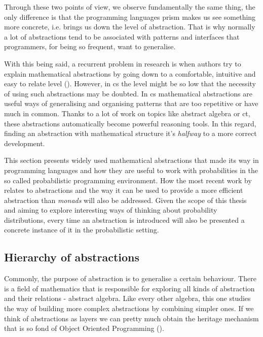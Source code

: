 \documentclass[
  oneside,
  11pt, a4paper,
  footinclude=true,
  headinclude=true,
  cleardoublepage=empty
]{scrbook}
\theoremstyle{definition}
\theoremstyle{definition}
\begin{document}
	    Through these two points of view, we observe fundamentally the same thing, the only difference is that the programming languages prism makes us see something more concrete, i.e. brings us down the level of abstraction. That is why normally a lot of abstractions tend to be associated with patterns and interfaces that programmers, for being so frequent, want to generalise.
	    
	    With this being said, a recurrent problem in research is when authors try to explain mathematical abstractions by going down to a comfortable, intuitive and easy to relate level (\cite{DBLP:journals/corr/abs-1803-10195}). However, in \gls{cs} the level might be so low that the necessity of using such abstractions may be doubted. In \gls{cs} mathematical abstractions are useful ways of generalising and organising patterns that are too repetitive or have much in common. Thanks to a lot of work on topics like abstract algebra or \gls{ct}, these abstractions automatically become powerful reasoning tools. In this regard, finding an abstraction with mathematical structure it's \emph{halfway} to a more correct development.
	    
	    This section presents widely used mathematical abstractions that made its way in programming languages and how they are useful to work with probabilities in the so called probabilistic programming environment. How the most recent work by \cite{andrey2019selective} relates to abstractions and the way it can be used to provide a more efficient abstraction than \emph{monads} will also be addressed. Given the scope of this thesis and aiming to explore interesting ways of thinking about probability distributions, every time an abstraction is introduced will also be presented a concrete instance of it in the probabilistic setting.
	    
	    \subsection{Hierarchy of abstractions}
	    
	    Commonly, the purpose of abstraction is to generalise a certain behaviour. There is a field of mathematics that is responsible for exploring all kinds of abstraction and their relations - abstract algebra. Like every other algebra, this one studies the way of building more complex abstractions by combining simpler ones. If we think of abstractions as layers we can pretty much obtain the heritage mechanism that is so fond of Object Oriented Programming (\cite{Liskov:1987:KAD:62139.62141}).
	    
\end{document}
